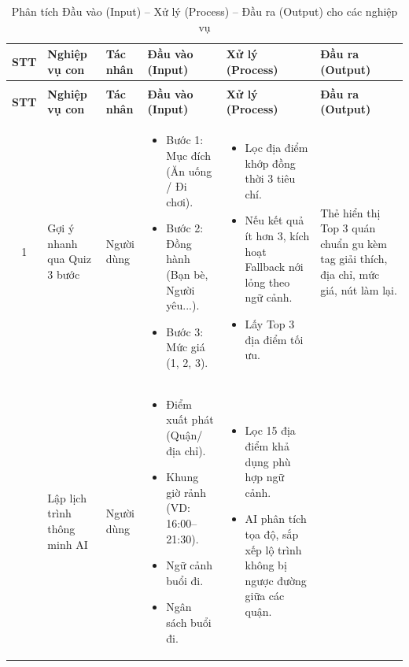 \documentclass[13pt,a4paper]{extreport}
\newcommand{\hd}[1]{\centering\arraybackslash\textbf{#1}}
\begin{document}
\setlength{\tabcolsep}{3.5pt}
\begin{longtable}{|>{\raggedright\arraybackslash}c|L{2.2cm}|L{1.6cm}|L{3.1cm}|L{3.8cm}|L{2.4cm}|}
\caption{Phân tích Đầu vào (Input) -- Xử lý (Process) -- Đầu ra (Output) cho các nghiệp vụ}\label{tab:ipo}\\
\hline
\hd{STT} & \hd{Nghiệp vụ con} & \hd{Tác nhân} & \hd{Đầu vào (Input)} & \hd{Xử lý (Process)} & \hd{Đầu ra (Output)} \\
\hline
\endfirsthead
{}\\
\hline
\hd{STT} & \hd{Nghiệp vụ con} & \hd{Tác nhân} & \hd{Đầu vào (Input)} & \hd{Xử lý (Process)} & \hd{Đầu ra (Output)} \\
\hline
\endhead
\hline
\endfoot
\hline
\endlastfoot

1 & Gợi ý nhanh qua Quiz 3 bước & Người dùng &
\begin{itemize}[leftmargin=0.4cm,nosep]
    \item Bước 1: Mục đích (Ăn uống / Đi chơi).
    \item Bước 2: Đồng hành (Bạn bè, Người yêu...).
    \item Bước 3: Mức giá (1, 2, 3).
\end{itemize} &
\begin{itemize}[leftmargin=0.4cm,nosep]
    \item Lọc địa điểm khớp đồng thời 3 tiêu chí.
    \item Nếu kết quả ít hơn 3, kích hoạt Fallback nới lỏng theo ngữ cảnh.
    \item Lấy Top 3 địa điểm tối ưu.
\end{itemize} &
Thẻ hiển thị Top 3 quán chuẩn gu kèm tag giải thích, địa chỉ, mức giá, nút làm lại. \\
 & Lập lịch trình thông minh AI & Người dùng &
\begin{itemize}[leftmargin=0.4cm,nosep]
    \item Điểm xuất phát (Quận/địa chỉ).
    \item Khung giờ rảnh (VD: 16:00--21:30).
    \item Ngữ cảnh buổi đi.
    \item Ngân sách buổi đi.
\end{itemize} &
\begin{itemize}[leftmargin=0.4cm,nosep]
    \item Lọc 15 địa điểm khả dụng phù hợp ngữ cảnh.
    \item AI phân tích tọa độ, sắp xếp lộ trình không bị ngược đường giữa các quận.

\end{itemize}
\end{longtable}
\end{document}
